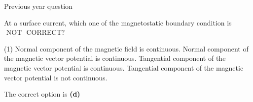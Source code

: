\begin{center}
\end{center}
\newpage
\begin{abox}
	Previous year question
	\end{abox}
\begin{enumerate}
	\begin{minipage}{\textwidth}
		\item At a surface current, which one of the magnetostatic boundary condition is $\underline{\text { NOT }}$ CORRECT?
	\end{minipage}
	\begin{tasks}(1)
		\task[\textbf{A.}]Normal component of the magnetic field is continuous.
		\task[\textbf{B.}]Normal component of the magnetic vector potential is continuous.
		\task[\textbf{C.}]Tangential component of the magnetic vector potential is continuous.
		\task[\textbf{D.}]Tangential component of the magnetic vector potential is not continuous.
	\end{tasks}
	\begin{answer}
		The correct option is \textbf{(d)}
	\end{answer}

\end{enumerate}

